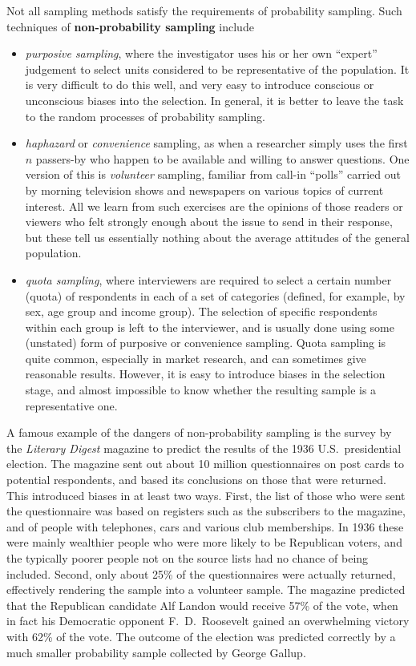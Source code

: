 Not all sampling methods satisfy the requirements of probability
sampling. Such techniques of \textbf{non-probability sampling} include
\begin{itemize}
\item
\emph{purposive sampling}, where the investigator uses his or her own
``expert'' judgement to select units considered to be representative of
the population. It is very difficult to do this well, and very easy to
introduce conscious or unconscious biases into the selection. In general,
it is better to leave the task to the random processes of probability
sampling.
\item
\emph{haphazard} or \emph{convenience} sampling, as
when a researcher simply uses the first $n$ passers-by who happen to be
available and willing to answer questions. One version of this is
\emph{volunteer} sampling, familiar from call-in ``polls'' carried out
by morning television shows and newspapers on various topics of current
interest. All we learn from such exercises are the opinions of those
readers or viewers who felt strongly enough about the issue to send in
their response, but these tell us essentially nothing about the
average attitudes of the general population.
\item
\emph{quota sampling}, where interviewers are required to select a
certain number (quota) of respondents in each of a set of categories
(defined, for example, by sex, age group and income group). The
selection of specific respondents within each group is left to the
interviewer, and is usually done using some (unstated) form of purposive or
convenience sampling. Quota sampling is quite common, especially in
market research, and can sometimes give reasonable results. However, it
is easy to introduce biases in the selection stage, and almost
impossible to know whether the resulting sample is a representative one.
\end{itemize}

A famous example of the dangers of non-probability sampling is the
survey by the \emph{Literary Digest} magazine to predict the results of
the 1936 U.S.\ presidential election. The magazine sent out about 10
million questionnaires on post cards to potential respondents, and based
its conclusions on those that were returned. This introduced biases in
at least two ways. First, the list of those who were sent the
questionnaire was based on registers such as the subscribers to the
magazine, and of people with telephones, cars and various club
memberships. In 1936 these were mainly wealthier people who were more
likely to be Republican voters, and the typically poorer people not on
the source lists had no chance of being included. Second, only about
25\% of the questionnaires were actually returned, effectively rendering
the sample into a volunteer sample. The magazine predicted that the
Republican candidate Alf Landon would receive 57\% of the vote, when in
fact his Democratic opponent F.\ D.\ Roosevelt gained an overwhelming
victory with 62\% of the vote. The outcome of the election was predicted
correctly by a much smaller probability sample collected by George
Gallup.


